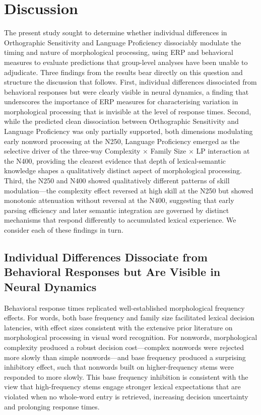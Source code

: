 \section{Discussion}
	
	The present study sought to determine whether individual differences in Orthographic Sensitivity and Language Proficiency dissociably modulate the timing and nature of morphological processing, using ERP and behavioral measures to evaluate predictions that group-level analyses have been unable to adjudicate. Three findings from the results bear directly on this question and structure the discussion that follows. First, individual differences dissociated from behavioral responses but were clearly visible in neural dynamics, a finding that underscores the importance of ERP measures for characterising variation in morphological processing that is invisible at the level of response times. Second, while the predicted clean dissociation between Orthographic Sensitivity and Language Proficiency was only partially supported, both dimensions modulating early nonword processing at the N250, Language Proficiency emerged as the selective driver of the three-way Complexity $\times$ Family Size $\times$ LP interaction at the N400, providing the clearest evidence that depth of lexical-semantic knowledge shapes a qualitatively distinct aspect of morphological processing. Third, the N250 and N400 showed qualitatively different patterns of skill modulation—the complexity effect reversed at high skill at the N250 but showed monotonic attenuation without reversal at the N400, suggesting that early parsing efficiency and later semantic integration are governed by distinct mechanisms that respond differently to accumulated lexical experience. We consider each of these findings in turn.
	
	\subsection{Individual Differences Dissociate from Behavioral Responses but Are Visible in Neural Dynamics}
	
	Behavioral response times replicated well-established morphological frequency effects. For words, both base frequency and family size facilitated lexical decision latencies, with effect sizes consistent with the extensive prior literature on morphological processing in visual word recognition. For nonwords, morphological complexity produced a robust decision cost—complex nonwords were rejected more slowly than simple nonwords—and base frequency produced a surprising inhibitory effect, such that nonwords built on higher-frequency stems were responded to more slowly. This base frequency inhibition is consistent with the view that high-frequency stems engage stronger lexical expectations that are violated when no whole-word entry is retrieved, increasing decision uncertainty and prolonging response times.
	
